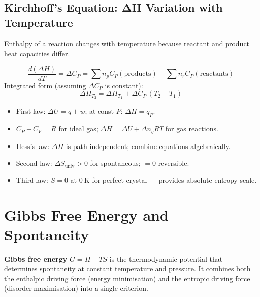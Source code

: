 \documentclass[12pt,a4paper]{article}
\begin{document}
\subsection{Kirchhoff's Equation: ΔH Variation with Temperature}
Enthalpy of a reaction changes with temperature because reactant and product heat capacities differ.

\begin{tcolorbox}[formulabox, title={Kirchhoff's Equation}]
\[
\frac{d(\Delta H)}{dT} = \Delta C_P = \sum n_p C_P(\text{products}) - \sum n_r C_P(\text{reactants})
\]
Integrated form (assuming $\Delta C_P$ is constant):
\[
\Delta H_{T_2} = \Delta H_{T_1} + \Delta C_P\,(T_2 - T_1)
\]
\end{tcolorbox}

\begin{tcolorbox}[exambox, title={Exam Points (Section 1)}]
\begin{itemize}[leftmargin=*, itemsep=2pt, topsep=2pt]
  \item First law: $\Delta U = q + w$; at const $P$: $\Delta H = q_P$.
  \item $C_P - C_V = R$ for ideal gas; $\Delta H = \Delta U + \Delta n_g RT$ for gas reactions.
  \item Hess's law: $\Delta H$ is path-independent; combine equations algebraically.
  \item Second law: $\Delta S_{\mathrm{univ}} > 0$ for spontaneous; $= 0$ reversible.
  \item Third law: $S = 0$ at $0\ \mathrm{K}$ for perfect crystal — provides absolute entropy scale.
\end{itemize}
\end{tcolorbox}

\section{Gibbs Free Energy and Spontaneity}

\begin{tcolorbox}[defbox]
\textbf{Gibbs free energy} $G = H - TS$ is the thermodynamic potential that determines spontaneity at constant temperature and pressure. It combines both the enthalpic driving force (energy minimisation) and the entropic driving force (disorder maximisation) into a single criterion.
\end{tcolorbox}
\end{document}
